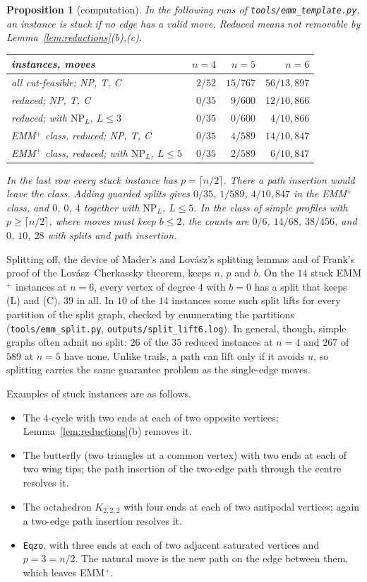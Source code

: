 \documentclass[11pt]{amsart}
\newtheorem{proposition}[theorem]{Proposition}
\theoremstyle{definition}
\begin{document}
\begin{proposition}[computation]\label{prop:template}
In the following runs of \texttt{tools/emm\_template.py}, an instance is \emph{stuck} if no edge
has a valid move. \emph{Reduced} means not removable by Lemma~\ref{lem:reductions}(b),(c).
\begin{center}
\begin{tabular}{lrrr}
\toprule
instances, moves & $n=4$ & $n=5$ & $n=6$\\
\midrule
all cut-feasible; NP, T, C & $2/52$ & $15/767$ & $56/13{,}897$\\
reduced; NP, T, C & $0/35$ & $9/600$ & $12/10{,}866$\\
reduced; with $\mathrm{NP}_L$, $L\le3$ & $0/35$ & $0/600$ & $4/10{,}866$\\
EMM$^+$ class, reduced; NP, T, C & $0/35$ & $4/589$ & $14/10{,}847$\\
EMM$^+$ class, reduced; with $\mathrm{NP}_L$, $L\le5$ & $0/35$ & $2/589$ & $6/10{,}847$\\
\bottomrule
\end{tabular}
\end{center}
In the last row every stuck instance has $p=\lceil n/2\rceil$. There a path insertion would leave
the class. Adding guarded splits gives $0/35$, $1/589$, $4/10{,}847$ in the EMM$^+$ class, and
$0$, $0$, $4$ together with $\mathrm{NP}_L$, $L\le5$. In the class of simple profiles with
$p\ge\lceil n/2\rceil$, where moves must keep $b\le2$, the counts are $0/6$, $14/68$, $38/456$, and
$0$, $10$, $28$ with splits and path insertion.
\end{proposition}
Splitting off, the device of Mader's and Lov\'asz's splitting lemmas and of Frank's proof of the
Lov\'asz--Cherkassky theorem, keeps $n$, $p$ and $b$. On the $14$ stuck EMM$^+$ instances at $n=6$,
every vertex of degree $4$ with $b=0$ has a split that keeps (L) and (C), $39$ in all. In $10$ of
the $14$ instances some such split lifts for every partition of the split graph, checked by
enumerating the partitions (\texttt{tools/emm\_split.py}, \texttt{outputs/split\_lift6.log}). In
general, though, simple graphs often admit no split: $26$ of the $35$ reduced instances at $n=4$
and $267$ of $589$ at $n=5$ have none. Unlike trails, a path can lift only if it avoids $u$, so
splitting carries the same guarantee problem as the single-edge moves.

Examples of stuck instances are as follows.
\begin{itemize}
\item The $4$-cycle with two ends at each of two opposite vertices; Lemma~\ref{lem:reductions}(b)
removes it.
\item The butterfly (two triangles at a common vertex) with two ends at each of two wing tips; the
path insertion of the two-edge path through the centre resolves it.
\item The octahedron $K_{2,2,2}$ with four ends at each of two antipodal vertices; again a
two-edge path insertion resolves it.
\item \texttt{Eqzo}, with three ends at each of two adjacent saturated vertices and $p=3=n/2$.
The natural move is the new path on the edge between them, which leaves EMM$^+$.
\end{itemize}
\end{document}
